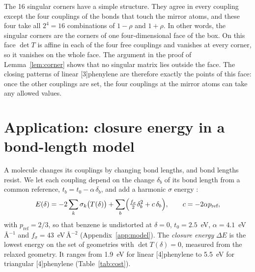 \documentclass[11pt]{article}
\begin{document}
The 16 singular corners have a simple structure. They agree in every coupling except the four couplings of the bonds that touch the mirror atoms, and these four take all $2^4=16$ combinations of $1-\rho$ and $1+\rho$. In other words, the singular corners are the corners of one four-dimensional face of the box. On this face $\det T$ is affine in each of the four free couplings and vanishes at every corner, so it vanishes on the whole face. The argument in the proof of Lemma~\ref{lem:corner} shows that no singular matrix lies outside the face. The closing patterns of linear [3]phenylene are therefore exactly the points of this face: once the other couplings are set, the four couplings at the mirror atoms can take any allowed values.

\section{Application: closure energy in a bond-length model}
\label{sec:energy}

A molecule changes its couplings by changing bond lengths, and bond lengths resist. We let each coupling depend on the change $\delta_b$ of its bond length from a common reference, $t_b=t_0-\alpha\,\delta_b$, and add a harmonic $\sigma$ energy \citep{SSH1979}:
\begin{equation}
E(\delta)=-2\sum_k\sigma_k\bigl(T(\delta)\bigr)+\sum_b\Bigl(\tfrac{f_\sigma}{2}\delta_b^2+c\,\delta_b\Bigr),\qquad c=-2\alpha p_{\text{ref}},
\end{equation}
with $p_{\text{ref}}=2/3$, so that benzene is undistorted at $\delta=0$, $t_0=2.5$~eV, $\alpha=4.1$~eV\,\AA$^{-1}$ \citep{SSH1979} and $f_\sigma=43$~eV\,\AA$^{-2}$ (Appendix~\ref{app:model}). The \emph{closure energy} $\Delta E$ is the lowest energy on the set of geometries with $\det T(\delta)=0$, measured from the relaxed geometry. It ranges from 1.9~eV for linear [4]phenylene to 5.5~eV for triangular [4]phenylene (Table~\ref{tab:cost}).
\end{document}
